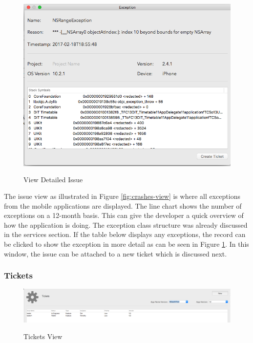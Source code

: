 \begin{figure}[!h]
    \caption{View Detailed Issue}
    \centering
    \includegraphics[width=150mm]{images/dashboard/view_crash}
    \label{fig:view-crash}
\end{figure} 

The issue view as illustrated in Figure \ref{fig:crashes-view} is where all exceptions from the mobile applications are displayed. The line chart shows the number of exceptions on a 12-month basis. This can give the developer a quick overview of how the application is doing. The exception class structure was already discussed in the services section. If the table below displays any exceptions, the record can be clicked to show the exception in more detail as can be seen in Figure  \ref{fig:view-crash}. In this window, the issue can be attached to a new ticket which is discussed next.

\subsubsection{Tickets}

\begin{figure}[!h]
    \caption{Tickets View}
    \centering
    \includegraphics[width=150mm]{images/dashboard/tickets}
    \label{fig:issues-view}
\end{figure} 


